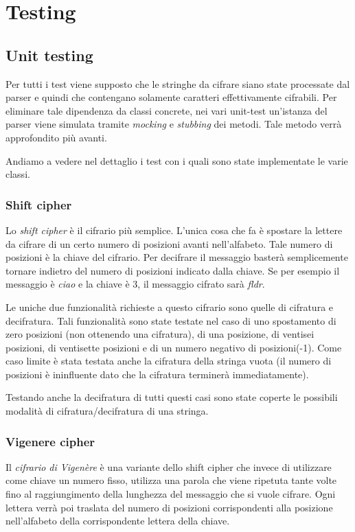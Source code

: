 \chapter{Testing}

	\section{Unit testing}
		Per tutti i test viene supposto che le stringhe da cifrare siano state processate dal parser e quindi che contengano solamente caratteri effettivamente cifrabili. Per eliminare tale dipendenza da classi concrete, nei vari unit-test un'istanza del parser viene simulata tramite \emph{mocking} e \emph{stubbing} dei metodi. Tale metodo verrà approfondito più avanti.
		
		Andiamo a vedere nel dettaglio i test con i quali sono state implementate le varie classi.
		
		\subsection{Shift cipher}
			Lo \emph{shift cipher} è il cifrario più semplice. L'unica cosa che fa è spostare la lettere da cifrare di un certo numero di posizioni avanti nell'alfabeto. Tale numero di posizioni è la chiave del cifrario. Per decifrare il messaggio basterà semplicemente tornare indietro del numero di posizioni indicato dalla chiave. Se per esempio il messaggio è \emph{ciao} e la chiave è 3, il messaggio cifrato sarà \emph{fldr}.
			
			Le uniche due funzionalità richieste a questo cifrario sono quelle di cifratura e decifratura. Tali funzionalità sono state testate nel caso di uno spostamento di zero posizioni (non ottenendo una cifratura), di una posizione, di ventisei posizioni, di ventisette posizioni e di un numero negativo di posizioni(-1). Come caso limite è stata testata anche la cifratura della stringa vuota (il numero di posizioni è ininfluente dato che la cifratura terminerà immediatamente).
			
			Testando anche la decifratura di tutti questi casi sono state coperte le possibili modalità di cifratura/decifratura di una stringa.
			
		\subsection{Vigenere cipher}
			Il \emph{cifrario di Vigenère} è una variante dello shift cipher che invece di utilizzare come chiave un numero fisso, utilizza una parola che viene ripetuta tante volte fino al raggiungimento della lunghezza del messaggio che si vuole cifrare. Ogni lettera verrà poi traslata del numero di posizioni corrispondenti alla posizione nell'alfabeto della corrispondente lettera della chiave.
			
